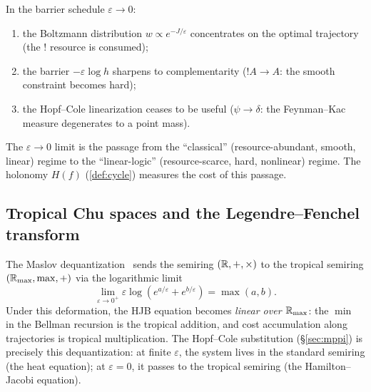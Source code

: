 \begin{remark}
\label{rmk:dereliction}
In the barrier schedule $\varepsilon \to 0$:
\begin{enumerate}[nosep]
\item the Boltzmann distribution
  $w \propto e^{-J/\varepsilon}$ concentrates on the optimal
  trajectory (the $!$ resource is consumed);
\item the barrier $-\varepsilon\log h$ sharpens to complementarity
  ($!A \to A$: the smooth constraint becomes hard);
\item the Hopf--Cole linearization ceases to be useful
  ($\psi \to \delta$: the Feynman--Kac measure degenerates to a point
  mass).
\end{enumerate}
The $\varepsilon \to 0$ limit is the passage from the ``classical''
(resource-abundant, smooth, linear) regime to the ``linear-logic''
(resource-scarce, hard, nonlinear) regime.
The holonomy $H(f)$ (\cref{def:cycle}) measures the cost of this
passage.
\end{remark}

\subsection*{Tropical Chu spaces and the Legendre--Fenchel transform}

The Maslov dequantization~\cite{Maslov} sends the semiring
$(\mathbb{R}, +, \times)$ to the tropical semiring
$(\mathbb{R}_{\max}, \max, +)$ via the logarithmic limit
\[
\lim_{\varepsilon \to 0^+} \varepsilon \log(e^{a/\varepsilon} +
e^{b/\varepsilon}) = \max(a,b).
\]
Under this deformation, the HJB equation becomes \emph{linear over
$\mathbb{R}_{\max}$}: the $\min$ in the Bellman recursion is the tropical
addition, and cost accumulation along trajectories is tropical
multiplication.
The Hopf--Cole substitution (\S\ref{sec:mppi}) is precisely this
dequantization: at finite $\varepsilon$, the system lives in the
standard semiring (the heat equation); at $\varepsilon = 0$, it
passes to the tropical semiring (the Hamilton--Jacobi equation).

